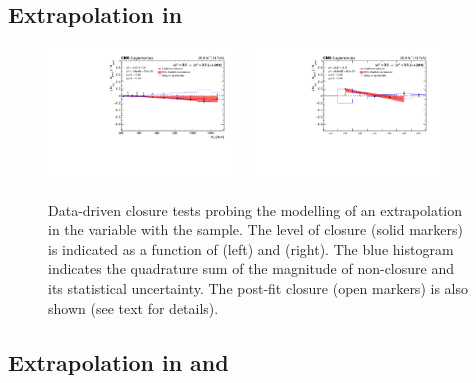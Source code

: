 \clearpage
\subsection{Extrapolation in \texorpdfstring{\bdphi}{biased dPhi}}

\begin{figure}[h!]
  \begin{center}
    \includegraphics[width=0.45\textwidth]{figures/closureTests/bDPhi/SingleMu_bdphiExtrapolation_ht.pdf}~
    \includegraphics[width=0.45\textwidth]{figures/closureTests/bDPhi/SingleMu_bdphiExtrapolation_nJet.pdf}\\
    \caption{Data-driven closure tests probing the modelling of an
      extrapolation in the \bdphi variable with the \mj sample. The
      level of closure (solid markers) is indicated as a function of
      \scalht (left) and \njet (right). The blue histogram indicates
      the quadrature sum of the magnitude of non-closure and its
      statistical uncertainty. The post-fit closure (open markers) is
      also shown (see text for details).  }
    \label{fig:closure_bDPhi_mu}
  \end{center} 
\end{figure}

\clearpage
\subsection{Extrapolation in \texorpdfstring{\alphat}{AlphaT} and
  \texorpdfstring{\bdphi}{biased dPhi}}

